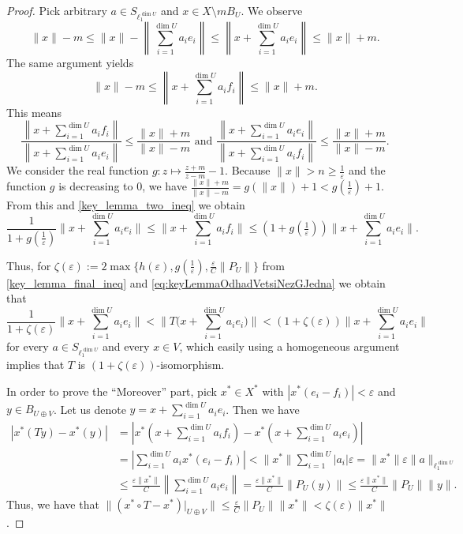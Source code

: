 \documentclass[10pt,a4paper]{amsart}
\begin{document}
\begin{proof}
    Pick arbitrary $a \in S_{\ell_1^{\dim U}}$ and $x \in X \setminus mB_U$. We observe
	\[
	\|x\| - m \leq \| x \| - \left\| \sum_{i=1}^{\dim U} a_i e_i \right\| \leq \left\| x + \sum_{i=1}^{\dim U} a_i e_i \right\| \leq \|x\| + m.
	\]
	The same argument yields
	\[
	\|x\| -m \leq \left\| x + \sum_{i=1}^{\dim U} a_i f_i \right\| \leq \|x\| + m.
	\]
	This means
	\begin{equation} \label{key_lemma_two_ineq}
		\frac{\left\| x + \sum_{i=1}^{\dim U} a_i f_i \right\|}{\left\| x + \sum_{i=1}^{\dim U} a_i e_i \right\|} \leq \frac{\|x\| + m}{\|x\| - m} \text{ and } \frac{\left\| x + \sum_{i=1}^{\dim U} a_i e_i \right\|}{\left\| x + \sum_{i=1}^{\dim U} a_i f_i \right\|} \leq \frac{\|x\| + m}{\|x\| - m}.
	\end{equation}
	We consider the real function $g: z \mapsto \frac{z+m}{z-m} - 1$. Because $\| x \| > n\geq \tfrac{1}{\varepsilon}$ and the function $g$ is decreasing to $0$, we have $\frac{\|x\| + m}{\|x\| - m} = g(\|x\|) +1<g(\tfrac{1}{\varepsilon}) + 1$. From this and \eqref{key_lemma_two_ineq} we obtain	\begin{equation}\label{eq:keyLemmaOdhadVetsiNezGJedna}
	\frac{1}{1 + g(\tfrac{1}{\varepsilon})} \Big\| x + \sum_{i=1}^{\dim U} a_i e_i \Big\|\leq \Big\| x + \sum_{i=1}^{\dim U} a_i f_i \Big\| \leq (1 + g(\tfrac{1}{\varepsilon})) \Big\| x + \sum_{i=1}^{\dim U} a_i e_i \Big\|.
	\end{equation}

 Thus, for $\zeta(\varepsilon):=2\max\{h(\varepsilon),g(\tfrac{1}{\varepsilon}),\frac{\varepsilon}{C} \|P_U\|\}$ from \eqref{key_lemma_final_ineq} and \eqref{eq:keyLemmaOdhadVetsiNezGJedna} we obtain that 
 \[
    \frac{1}{1 + \zeta(\varepsilon)} \Big\| x + \sum_{i=1}^{\dim U} a_i e_i \Big\| < \Big\| T\Big(x + \sum_{i=1}^{\dim U} a_i e_i\Big) \Big\| < (1 + \zeta(\varepsilon)) \Big\| x + \sum_{i=1}^{\dim U} a_i e_i \Big\|
 \]
 for every $a\in S_{\ell_1^{\dim U}}$ and every $x\in V$, which easily using a homogeneous argument implies that $T$ is $(1+\zeta(\varepsilon))$-isomorphism.

 In order to prove the ``Moreover'' part, pick $x^*\in X^*$ with $|x^*(e_i-f_i)|<\varepsilon$ and $y\in B_{U\oplus V}$. Let us denote $y = x + \sum_{i=1}^{\dim U} a_i e_i$. Then we have
	\begin{align*}
		\left| x^*(Ty) - x^*(y) \right| &= \left| x^*\left(x + \sum_{i=1}^{\dim U} a_i f_i\right) - x^*\left(x + \sum_{i=1}^{\dim U} a_i e_i\right) \right| \\
		&= \left| \sum_{i=1}^{\dim U} a_i x^*(e_i - f_i) \right| < \|x^*\|\sum_{i=1}^{\dim U} |a_i| \varepsilon = \|x^*\|\varepsilon \|a\|_{\ell_1^{\dim U}} \\
		&\leq \frac{\varepsilon\|x^*\|}{C} \left\| \sum_{i=1}^{\dim U} a_i e_i \right\| = \frac{\varepsilon\|x^*\|}{C} \| P_U(y) \| \leq \frac{\varepsilon\|x^*\|}{C} \|P_U\| \|y\|.
	\end{align*}
	Thus, we have that $\|(x^*\circ T - x^*)|_{U\oplus V}\| \leq \frac{\varepsilon}{C} \|P_U\|\|x^*\| < \zeta(\varepsilon)\|x^*\|$.
\end{proof}
\end{document}
